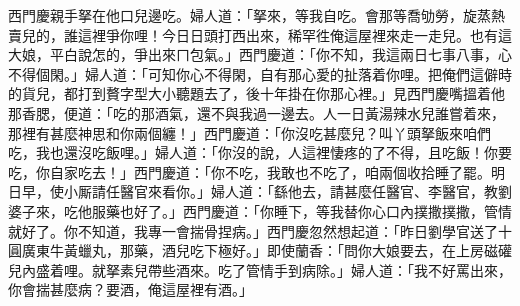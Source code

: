 西門慶親手拏在他口兒邊吃。婦人道：「拏來，等我自吃。會那等喬劬勞，旋蒸熱賣兒的，{}誰這裡爭你哩！{}{}今日日頭打西出來，稀罕徃俺這屋裡來走一走兒。也有這大娘，平白說怎的，爭出來ㄇ包氣。」西門慶道：「你不知，我這兩日七事八事，心不得個閑。」{}婦人道：「可知你心不得閑，自有那心愛的扯落着你哩。把俺們這僻時的貨兒，都打到贅字型大小聽題去了，後十年掛在你那心裡。」{}見西門慶嘴搵着他那香腮，便道：「吃的那酒氣，還不與我過一邊去。人一日黃湯辣水兒誰嘗着來，那裡有甚麼神思和你兩個纏！」西門慶道：「你沒吃甚麼兒？叫丫頭拏飯來咱們吃，我也還沒吃飯哩。」婦人道：「你沒的說，人這裡悽疼的了不得，且吃飯！你要吃，你自家吃去！」西門慶道：「你不吃，我敢也不吃了，咱兩個收拾睡了罷。明日早，使小厮請任醫官來看你。」婦人道：「繇他去，請甚麼任醫官、李醫官，教劉婆子來，吃他服藥也好了。」西門慶道：「你睡下，等我替你心口內撲撒撲撒，管情就好了。你不知道，我專一會揣骨捏病。」{}西門慶忽然想起道：「昨日劉學官送了十圓廣東牛黃蠟丸，那藥，酒兒吃下極好。」即使蘭香：「問你大娘要去，在上房磁礶兒內盛着哩。就拏素兒帶些酒來。吃了管情手到病除。」婦人道：「我不好罵出來，你會揣甚麼病？要酒，俺這屋裡有酒。」

